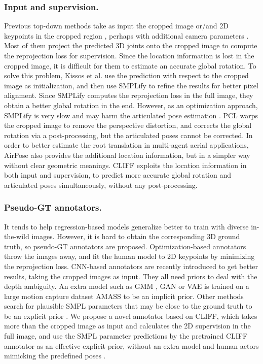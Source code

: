 \documentclass[runningheads]{llncs}
\begin{document}
\subsubsection{Input and supervision.}
Previous top-down methods take as input the cropped image \cite{kanazawa2018end} or/and 2D keypoints in the cropped region \cite{choi2020pose2mesh}, perhaps with additional camera parameters \cite{kocabas2021spec}.
Most of them project the predicted 3D joints onto the cropped image to compute the reprojection loss for supervision.
Since the location information is lost in the cropped image, it is difficult for them to estimate an accurate global rotation.
To solve this problem, Kissos et al. \cite{kissos2020beyond} use the prediction with respect to the cropped image as initialization, and then use SMPLify \cite{bogo2016keep} to refine the results for better pixel alignment.
Since SMPLify computes the reprojection loss in the full image, they obtain a better global rotation in the end.
However, as an optimization approach, SMPLify is very slow and may harm the articulated pose estimation \cite{joo2021exemplar,moon2020neuralannot}.
PCL \cite{yu2021pcls} warps the cropped image to remove the perspective distortion, and corrects the global rotation via a post-processing, but the articulated poses cannot be corrected.
In order to better estimate the root translation in multi-agent aerial applications, AirPose \cite{saini2022airpose} also provides the additional location information, but in a simpler way without clear geometric meanings.
CLIFF exploits the location information in both input and supervision, to predict more accurate global rotation and articulated poses simultaneously, without any post-processing.

\subsubsection{Pseudo-GT annotators.}
It tends to help regression-based models generalize better to train with diverse in-the-wild images.
However, it is hard to obtain the corresponding 3D ground truth, so pseudo-GT annotators are proposed.
Optimization-based annotators \cite{bogo2016keep} throw the images away, and fit the human model to 2D keypoints by minimizing the reprojection loss.
CNN-based annotators \cite{kolotouros2019learning,joo2021exemplar,moon2020neuralannot,kolotouros2021probabilistic,guan2021out} are recently introduced to get better results, taking the cropped images as input.
They all need priors to deal with the depth ambiguity.
An extra model such as GMM \cite{bogo2016keep}, GAN \cite{kanazawa2018end,davydov2021adversarial} or VAE \cite{pavlakos2019expressive,kocabas2020vibe} is trained on a large motion capture dataset AMASS \cite{mahmood2019amass} to be an implicit prior.
Other methods search for plausible SMPL parameters that may be close to the ground truth to be an explicit prior \cite{muller2021self,guan2021out}.
We propose a novel annotator based on CLIFF, which takes more than the cropped image as input and calculates the 2D supervision in the full image, and use the SMPL parameter predictions by the pretrained CLIFF annotator as an effective explicit prior, without an extra model and human actors mimicking the predefined poses \cite{muller2021self,kocabas2021spec}.
\end{document}
